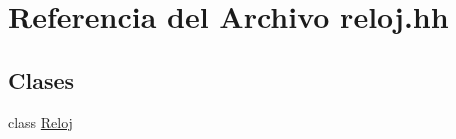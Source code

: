 \hypertarget{reloj_8hh}{\section{Referencia del Archivo reloj.\-hh}
\label{reloj_8hh}
}
\subsection*{Clases}
\begin{DoxyCompactItemize}
\item 
class \hyperlink{class_reloj}{Reloj}
\end{DoxyCompactItemize}
